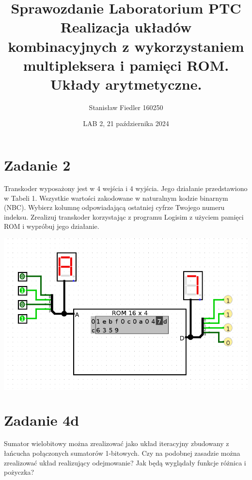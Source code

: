 \documentclass[a4paper, 11pt]{article}
\title{%
        \vspace{-3.5cm}
       \large Sprawozdanie Laboratorium PTC \\
       \huge Realizacja układów kombinacyjnych z wykorzystaniem multipleksera i
pamięci ROM. Układy arytmetyczne.}
\author{Stanisław Fiedler 160250}
\date{LAB 2, 21 października 2024}
\begin{document}
\maketitle

\section{Zadanie 2}\label{sec:zadanie2_} %

Transkoder wyposażony jest w 4 wejścia i 4 wyjścia.
Jego działanie przedstawiono w Tabeli 1.
Wszystkie wartości zakodowane w naturalnym kodzie binarnym (NBC).
Wybierz kolumnę odpowiadającą ostatniej cyfrze Twojego numeru indeksu.
Zrealizuj transkoder korzystając z programu Logisim z użyciem pamięci ROM i wypróbuj jego działanie.

\begin{center}
	\includegraphics[scale=0.4]{images/Pasted image.png}
\end{center}


\section{Zadanie 4d}\label{sec:zadanie4_} %
Sumator wielobitowy można zrealizować jako układ iteracyjny zbudowany z łańcucha połączonych sumatorów 1-bitowych.
Czy na podobnej zasadzie można zrealizować układ realizujący odejmowanie?
Jak będą wyglądały funkcje różnica i pożyczka?
\end{document}

